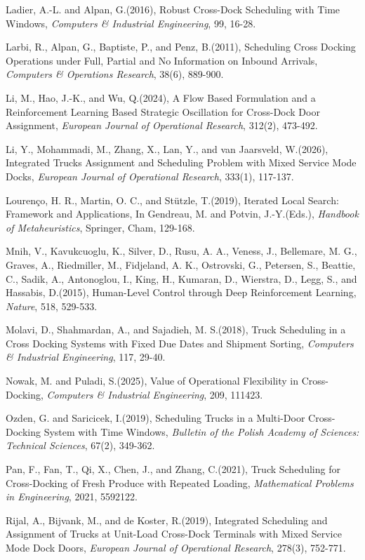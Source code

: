 \documentclass[10pt,a4paper]{article}
\begin{document}
\begin{description}
\item Ladier, A.-L. and Alpan, G.(2016), Robust Cross-Dock Scheduling with Time Windows, \emph{Computers \& Industrial Engineering}, 99, 16-28.
\item Larbi, R., Alpan, G., Baptiste, P., and Penz, B.(2011), Scheduling Cross Docking Operations under Full, Partial and No Information on Inbound Arrivals, \emph{Computers \& Operations Research}, 38(6), 889-900.
\item Li, M., Hao, J.-K., and Wu, Q.(2024), A Flow Based Formulation and a Reinforcement Learning Based Strategic Oscillation for Cross-Dock Door Assignment, \emph{European Journal of Operational Research}, 312(2), 473-492.
\item Li, Y., Mohammadi, M., Zhang, X., Lan, Y., and van Jaarsveld, W.(2026), Integrated Trucks Assignment and Scheduling Problem with Mixed Service Mode Docks, \emph{European Journal of Operational Research}, 333(1), 117-137.
\item Lourenço, H. R., Martin, O. C., and Stützle, T.(2019), Iterated Local Search: Framework and Applications, In Gendreau, M. and Potvin, J.-Y.(Eds.), \emph{Handbook of Metaheuristics}, Springer, Cham, 129-168.
\item Mnih, V., Kavukcuoglu, K., Silver, D., Rusu, A. A., Veness, J., Bellemare, M. G., Graves, A., Riedmiller, M., Fidjeland, A. K., Ostrovski, G., Petersen, S., Beattie, C., Sadik, A., Antonoglou, I., King, H., Kumaran, D., Wierstra, D., Legg, S., and Hassabis, D.(2015), Human-Level Control through Deep Reinforcement Learning, \emph{Nature}, 518, 529-533.
\item Molavi, D., Shahmardan, A., and Sajadieh, M. S.(2018), Truck Scheduling in a Cross Docking Systems with Fixed Due Dates and Shipment Sorting, \emph{Computers \& Industrial Engineering}, 117, 29-40.
\item Nowak, M. and Puladi, S.(2025), Value of Operational Flexibility in Cross-Docking, \emph{Computers \& Industrial Engineering}, 209, 111423.
\item Ozden, G. and Saricicek, I.(2019), Scheduling Trucks in a Multi-Door Cross-Docking System with Time Windows, \emph{Bulletin of the Polish Academy of Sciences: Technical Sciences}, 67(2), 349-362.
\item Pan, F., Fan, T., Qi, X., Chen, J., and Zhang, C.(2021), Truck Scheduling for Cross-Docking of Fresh Produce with Repeated Loading, \emph{Mathematical Problems in Engineering}, 2021, 5592122.
\item Rijal, A., Bijvank, M., and de Koster, R.(2019), Integrated Scheduling and Assignment of Trucks at Unit-Load Cross-Dock Terminals with Mixed Service Mode Dock Doors, \emph{European Journal of Operational Research}, 278(3), 752-771.

\end{description}
\end{document}
